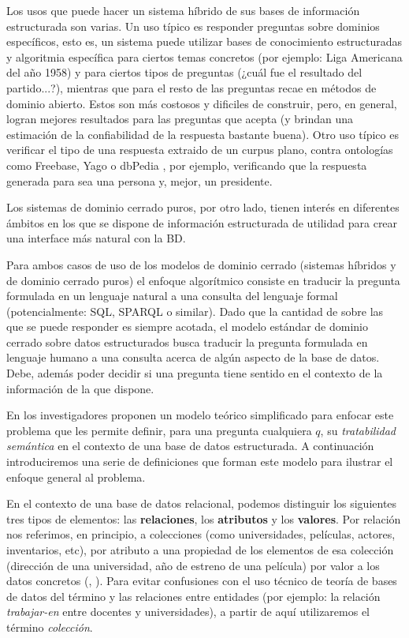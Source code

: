 Los usos que puede hacer un sistema híbrido de sus bases de información estructurada son varias. Un uso típico es responder preguntas sobre dominios específicos, esto es, un sistema puede utilizar bases de conocimiento estructuradas y algoritmia específica para ciertos temas concretos (por ejemplo: Liga Americana del año 1958) y para ciertos tipos de preguntas (¿cuál fue el resultado del partido...?), mientras que para el resto de las preguntas recae en métodos de dominio abierto. Estos  son más costosos y dificiles de construir, pero, en general, logran mejores resultados para las preguntas que acepta (y brindan una estimación de la confiabilidad de la respuesta bastante buena). Otro uso típico es verificar el tipo de una respuesta extraido de un curpus plano, contra ontologías como Freebase, Yago o dbPedia \cite{WATSON2}, por ejemplo, verificando que la respuesta generada para  sea una persona y, mejor, un presidente. 

Los sistemas de dominio cerrado puros, por otro lado, tienen interés en diferentes ámbitos en los que se dispone de información estructurada de utilidad para crear una interface más natural con la BD. %

Para ambos casos de uso de los modelos de dominio cerrado (sistemas híbridos y de dominio cerrado puros) el enfoque algorítmico consiste en traducir la pregunta formulada en un lenguaje natural a una consulta del lenguaje formal (potencialmente: SQL, SPARQL o similar). Dado que la cantidad de  sobre las que se puede responder es siempre acotada, el modelo estándar de dominio cerrado sobre datos estructurados busca traducir la pregunta formulada en lenguaje humano a una consulta acerca de algún aspecto de la base de datos. Debe, además poder decidir si una pregunta tiene sentido en el contexto de la información de la que dispone. 

En \cite{QADB1} los investigadores proponen un modelo teórico simplificado para enfocar este problema que les permite definir, para una pregunta cualquiera $q$, su \textit{tratabilidad semántica} en el contexto de una base de datos estructurada. A continuación introduciremos una serie de definiciones que forman este modelo  para ilustrar el enfoque general al problema. 

En el contexto de una base de datos relacional, podemos distinguir los siguientes tres tipos de elementos: las \textbf{relaciones}, los \textbf{atributos} y los \textbf{valores}. Por relación nos referimos, en principio, a colecciones (como universidades, películas, actores, inventarios, etc), por atributo a una propiedad de los elementos de esa colección (dirección de una universidad, año de estreno de una película) por valor a los datos concretos (, ). Para evitar confusiones con el uso técnico de teoría de bases de datos del término  y las relaciones entre entidades (por ejemplo: la relación \textit{trabajar-en} entre docentes y universidades), a partir de aquí utilizaremos el término \textit{colección}.

